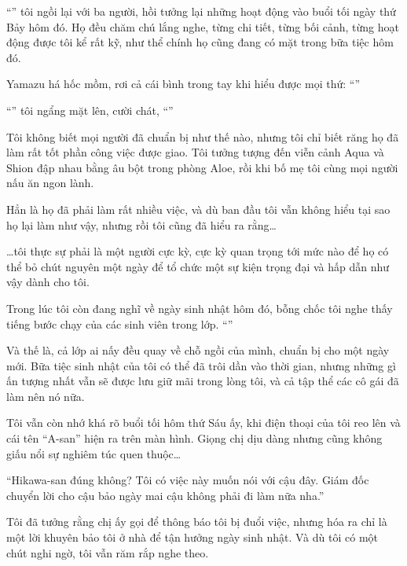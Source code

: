 \documentclass[../main.tex]{subfiles}
\begin{document}
``'' tôi ngồi lại với ba người, hồi tưởng lại những hoạt động vào buổi tối ngày thứ Bảy hôm đó. Họ đều chăm chú lắng nghe, từng chi tiết, từng bối cảnh, từng hoạt động được tôi kể rất kỹ, như thể chính họ cũng đang có mặt trong bữa tiệc hôm đó.

Yamazu há hốc mồm, rơi cả cái bình trong tay khi hiểu được mọi thứ: ``''

``'' tôi ngẩng mặt lên, cười chát, ``''

Tôi không biết mọi người đã chuẩn bị như thế nào, nhưng tôi chỉ biết răng họ đã làm rất tốt phần công việc được giao. Tôi tưởng tượng đến viễn cảnh Aqua và Shion đập nhau bằng âu bột trong phòng Aloe, rồi khi bố mẹ tôi cùng mọi người nấu ăn ngon lành.

Hẳn là họ đã phải làm rất nhiều việc, và dù ban đầu tôi vẫn không hiểu tại sao họ lại làm như vậy, nhưng rồi tôi cũng đã hiểu ra rằng\dots

\dots tôi thực sự phải là một người cực kỳ, cực kỳ quan trọng tới mức nào để họ có thể bỏ chút nguyên một ngày để tổ chức một sự kiện trọng đại và hấp dẫn như vậy dành cho tôi.

Trong lúc tôi còn đang nghĩ về ngày sinh nhật hôm đó, bỗng chốc tôi nghe thấy tiếng bước chạy của các sinh viên trong lớp. ``''

Và thế là, cả lớp ai nấy đều quay về chỗ ngồi của mình, chuẩn bị cho một ngày mới. Bữa tiệc sinh nhật của tôi có thể đã trôi dần vào thời gian, nhưng những gì ấn tượng nhất vẫn sẽ được lưu giữ mãi trong lòng tôi, và cả tập thể các cô gái đã làm nên nó nữa.

\il

Tôi vẫn còn nhớ khá rõ buổi tối hôm thứ Sáu ấy, khi điện thoại của tôi reo lên và cái tên ``A-san'' hiện ra trên màn hình. Giọng chị dịu dàng nhưng cũng không giấu nổi sự nghiêm túc quen thuộc\dots

``Hikawa-san đúng không? Tôi có việc này muốn nói với cậu đây. Giám đốc chuyển lời cho cậu bảo ngày mai cậu không phải đi làm nữa nha.''

Tôi đã tưởng rằng chị ấy gọi để thông báo tôi bị đuổi việc, nhưng hóa ra chỉ là một lời khuyên bảo tôi ở nhà để tận hưởng ngày sinh nhật. Và dù tôi có một chút nghi ngờ, tôi vẫn răm rắp nghe theo.
\end{document}
